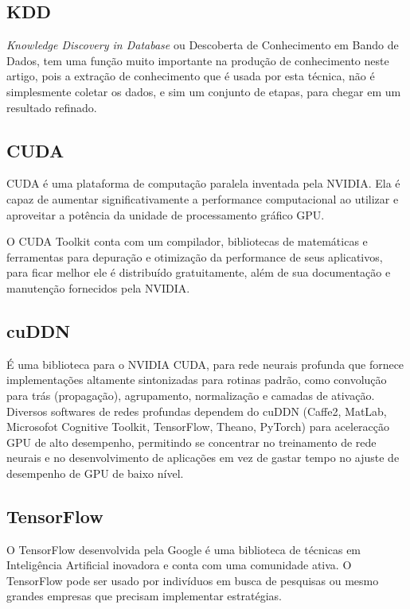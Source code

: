 \documentclass[conference]{IEEEtran}
\begin{document}
	\subsection{KDD}
	\textit{Knowledge Discovery in Database} ou Descoberta de Conhecimento em Bando de Dados, tem uma função muito importante na produção de conhecimento neste artigo, pois a extração de conhecimento que é usada por esta técnica, não é simplesmente coletar os dados, e sim um conjunto de etapas, para chegar em um resultado refinado.
	
	\subsection{CUDA}
	CUDA \'e uma plataforma de computa\c{c}\~ao paralela inventada pela NVIDIA. Ela \'e capaz de aumentar significativamente a performance computacional ao utilizar e aproveitar a pot\^encia da unidade de processamento gr\'afico GPU.
	
	
	
	O CUDA Toolkit conta com um compilador, bibliotecas de matem\'aticas e ferramentas para depura\c{c}\~ao e otimiza\c{c}\~ao da performance de seus aplicativos, para ficar melhor ele   \'e distribu\'ido gratuitamente, al\'em de sua documenta\c{c}\~ao e manuten\c{c}\~ao fornecidos pela NVIDIA.
	
	\subsection{cuDDN}
	\'E uma biblioteca para o NVIDIA CUDA, para rede neurais profunda que fornece implementa\c{c}\~oes altamente sintonizadas para rotinas padr\~ao, como convolu\c{c}\~ao para tr\'as (propaga\c{c}\~ao), agrupamento, normaliza\c{c}\~ao e camadas de ativa\c{c}\~ao.
	Diversos softwares de redes profundas dependem do cuDDN (Caffe2, MatLab, Microsofot Cognitive Toolkit, TensorFlow, Theano, PyTorch) para acelerac\c{c}\~ao GPU de alto desempenho, permitindo se concentrar no treinamento de rede neurais e no desenvolvimento de aplica\c{c}\~oes em vez de gastar tempo no ajuste de desempenho de GPU de baixo n\'ivel.
	
	\subsection{TensorFlow}
	O TensorFlow desenvolvida pela Google é uma biblioteca  de técnicas em Inteligência Artificial inovadora e conta com uma comunidade ativa. O TensorFlow pode ser usado por indivíduos em busca de pesquisas ou mesmo grandes empresas que precisam implementar estratégias.
	
\end{document}
